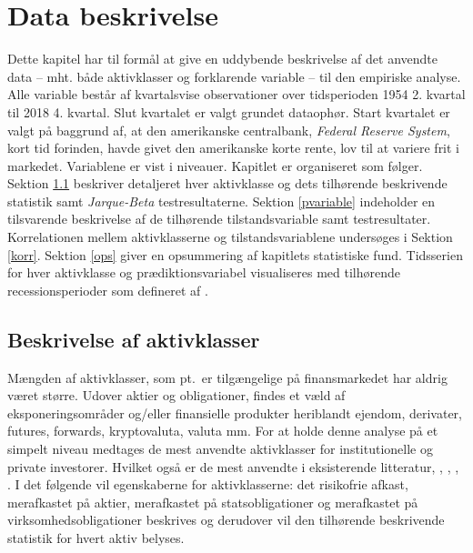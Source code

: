 \documentclass[
  a4paper,
  oneside]{memoir}
\begin{document}
\hypertarget{kapiteldatab}{%
\chapter{Data beskrivelse}\label{kapiteldatab}}

Dette kapitel har til formål at give en uddybende beskrivelse af det anvendte data -- mht. både aktivklasser og forklarende variable -- til den empiriske analyse. Alle variable består af kvartalsvise observationer over tidsperioden 1954 2. kvartal til 2018 4. kvartal. Slut kvartalet er valgt grundet dataophør. Start kvartalet er valgt på baggrund af, at den amerikanske centralbank, \emph{Federal Reserve System}, kort tid forinden, havde givet den amerikanske korte rente, lov til at variere frit i markedet. Variablene er vist i niveauer. Kapitlet er organiseret som følger. Sektion \ref{aktivklasser} beskriver detaljeret hver aktivklasse og dets tilhørende beskrivende statistik samt \emph{Jarque-Beta} testresultaterne. Sektion \ref{pvariable} indeholder en tilsvarende beskrivelse af de tilhørende tilstandsvariable samt testresultater. Korrelationen mellem aktivklasserne og tilstandsvariablene undersøges i Sektion \ref{korr}. Sektion \ref{ops} giver en opsummering af kapitlets statistiske fund. Tidsserien for hver aktivklasse og prædiktionsvariabel visualiseres med tilhørende recessionsperioder som defineret af \citep{NBER2020}.

\hypertarget{aktivklasser}{%
\section{Beskrivelse af aktivklasser}\label{aktivklasser}}

Mængden af aktivklasser, som pt.~er tilgængelige på finansmarkedet har aldrig været større. Udover aktier og obligationer, findes et væld af eksponeringsområder og/eller finansielle produkter heriblandt ejendom, derivater, futures, forwards, kryptovaluta, valuta mm. For at holde denne analyse på et simpelt niveau medtages de mest anvendte aktivklasser for institutionelle og private investorer. Hvilket også er de mest anvendte i eksisterende litteratur, \citep{CampVic2003, CampVic1999}, \citep{JurVic2011}, \citep{Engsted2012}, \citep{CampVicCha2003}. I det følgende vil egenskaberne for aktivklasserne: det risikofrie afkast, merafkastet på aktier, merafkastet på statsobligationer og merafkastet på virksomhedsobligationer beskrives og derudover vil den tilhørende beskrivende statistik for hvert aktiv belyses.
\end{document}
